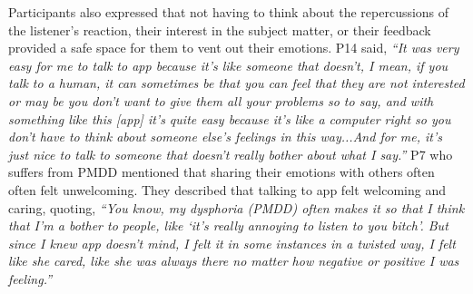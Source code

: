         Participants also expressed that not having to think about the repercussions of the listener's reaction, their interest in the subject matter, or their feedback provided a safe space for them to vent out their emotions. P14 said,
                \textit{
               ``It was very easy for me to talk to \acl{app} because it's like someone that doesn't, I mean, if you talk to a human, it can sometimes be that you can feel that they are not interested or may be you don't want to give them all your problems so to say, and with something like this [\acl{app}] it's quite easy because it's like a computer right so you don't have to think about someone else's feelings in this way...And for me, it's just nice to talk to someone that doesn't really bother about what I say.''
                } 
        P7 who suffers from \acl{PMDD} mentioned that sharing their emotions with others often often felt unwelcoming. 
        They described that talking to \acl{app} felt welcoming and caring, quoting,
                \textit{
                ``You know, my dysphoria (\acl{PMDD}) often makes it so that I think that I'm a bother to people, like `it's really annoying to listen to you bitch'. But since I knew \acl{app} doesn't mind, I felt it in some instances in a twisted way, I felt like she cared, like she was always there no matter how negative or positive I was feeling.''
                } 
        

